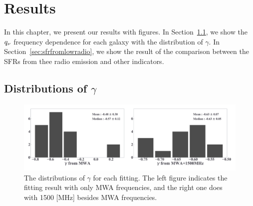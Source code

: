 \chapter{Results}\label{chap:results}
\begin{chapabstract}

In this chapter, we present our results with figures.
In Section~\ref{sec:GammaDistribution}, we show the $q_{\nu}$ frequency dependence for each galaxy with the distribution of $\gamma$.
In Section~\ref{sec:sfrfromlowradio}, we show the result of the comparison between the SFRs from thee radio emission and other indicators.

\end{chapabstract}


%

\section{Distributions of $\gamma$}\label{sec:GammaDistribution}

\begin{figure}[htbp]
	\centering
	\includegraphics[width=\linewidth]{Chapter_5/Figures/Result_comparehist.pdf}
    \caption[Histograms of $\gamma$ from the fitting]{\label{fig:comparehist}
        The distributions of $\gamma$ for each fitting.
        The left figure indicates the fitting result with only MWA frequencies, and the right one does with 1500 [MHz] besides MWA frequencies.
    }
\end{figure}

